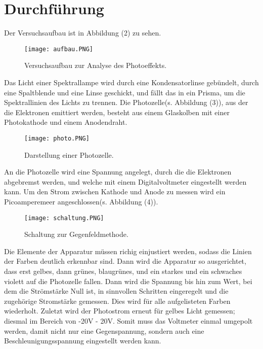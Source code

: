 \section{Durchführung}
\label{sec:Durchführung}

Der Versuchsaufbau ist in Abbildung (2) zu sehen.
\begin{figure}[H]
  \centering
  \texttt{[image: aufbau.PNG]}
  \caption{Versuchsaufbau zur Analyse des Photoeffekts. \cite{kent}}
\end{figure}
Das Licht einer Spektrallampe wird durch eine Kondensatorlinse gebündelt, durch eine Spaltblende und eine Linse geschickt, und fällt das in ein Prisma, um die Spektrallinien des Lichts zu trennen.
Die Photozelle(s. Abbildung (3)), aus der die Elektronen emittiert werden, besteht aus einem Glaskolben mit einer Photokathode und einem Anodendraht. 
\begin{figure}[H]
  \centering
  \texttt{[image: photo.PNG]}
  \caption{Darstellung einer Photozelle. \cite{kent}}
\end{figure}
An die Photozelle wird eine Spannung angelegt, durch die die Elektronen abgebremst werden, und welche mit einem Digitalvoltmeter eingestellt werden kann. Um den Strom zwischen Kathode und Anode zu messen wird ein Picoamperemeer angeschlossen(s. Abbildung (4)). 
\begin{figure}[H]
  \centering
  \texttt{[image: schaltung.PNG]}
  \caption{Schaltung zur Gegenfeldmethode. \cite{kent}}
\end{figure}
Die Elemente der Apparatur müssen richig einjustiert werden, sodass die Linien der Farben deutlich erkennbar sind. Dann wird die Apparatur so ausgerichtet, dass erst gelbes, dann grünes, blaugrünes, und ein starkes und ein schwaches violett auf die Photozelle fallen.
Dann wird die Spannung bis hin zum Wert, bei dem die Strömstärke Null ist, in sinnvollen Schritten eingeregelt und die zugehörige Stromstärke gemessen.
Dies wird für alle aufgelisteten Farben wiederholt.
Zuletzt wird der Photostrom erneut für gelbes Licht gemessen; diesmal im Bereich von -20V - 20V. Somit muss das Voltmeter einmal umgepolt werden, damit nicht nur eine Gegenspannung, sondern auch eine Beschleunigungsspannung eingestellt werden kann.